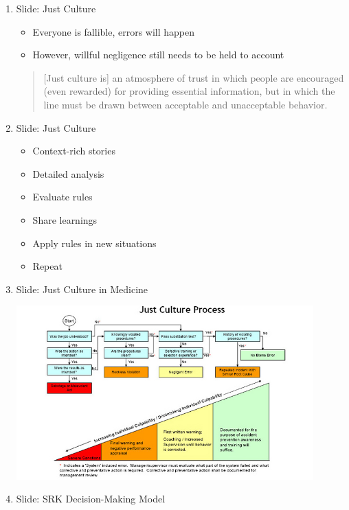 \documentclass[]{article}
\begin{document}
\begin{enumerate}
    \item Slide: Just Culture
    \begin{itemize}
        \item Everyone is fallible, errors will happen
        \item However, willful negligence still needs to be held to account
    \end{itemize}

    \begin{quote}
        [Just culture is] an atmosphere of trust in which people are encouraged (even rewarded) for providing essential information, but in which the line must be drawn between acceptable and unacceptable behavior.
    \end{quote}

    \item Slide: Just Culture
    \begin{itemize}
        \item Context-rich stories
        \item Detailed analysis
        \item Evaluate rules
        \item Share learnings
        \item Apply rules in new situations
        \item Repeat
    \end{itemize}

    \item Slide: Just Culture in Medicine

    \includegraphics[width=0.9\textwidth]{just_culture_UA.jpg}

    \item Slide: SRK Decision-Making Model


\end{enumerate}
\end{document}
